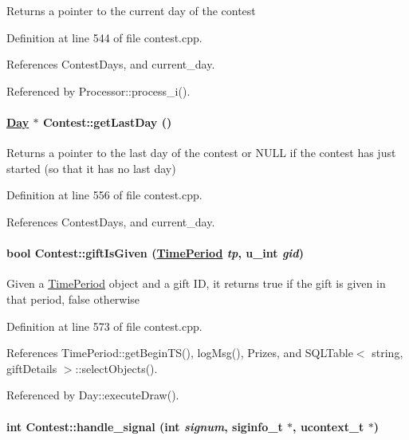Returns a pointer to the current day of the contest 

Definition at line 544 of file contest.cpp.

References Contest\-Days, and current\_\-day.

Referenced by Processor::process\_\-i().\hypertarget{classContest_Contesta16}{
\paragraph[getLastDay]{\setlength{\rightskip}{0pt plus 5cm}\hyperlink{classDay}{Day} $\ast$ Contest::get\-Last\-Day ()}\hfill}
\label{classContest_Contesta16}


Returns a pointer to the last day of the contest or NULL if the contest has just started (so that it has no last day) 

Definition at line 556 of file contest.cpp.

References Contest\-Days, and current\_\-day.\hypertarget{classContest_Contesta18}{
\paragraph[giftIsGiven]{\setlength{\rightskip}{0pt plus 5cm}bool Contest::gift\-Is\-Given (\hyperlink{classTimePeriod}{Time\-Period} {\em tp}, u\_\-int {\em gid})}\hfill}
\label{classContest_Contesta18}


Given a \hyperlink{classTimePeriod}{Time\-Period} object and a gift ID, it returns true if the gift is given in that period, false otherwise 

Definition at line 573 of file contest.cpp.

References Time\-Period::get\-Begin\-TS(), log\-Msg(), Prizes, and SQLTable$<$ string, gift\-Details $>$::select\-Objects().

Referenced by Day::execute\-Draw().\hypertarget{classContest_Contesta6}{
\paragraph[handle\_\-signal]{\setlength{\rightskip}{0pt plus 5cm}int Contest::handle\_\-signal (int {\em signum}, siginfo\_\-t $\ast$, ucontext\_\-t $\ast$)}\hfill}
\label{classContest_Contesta6}


